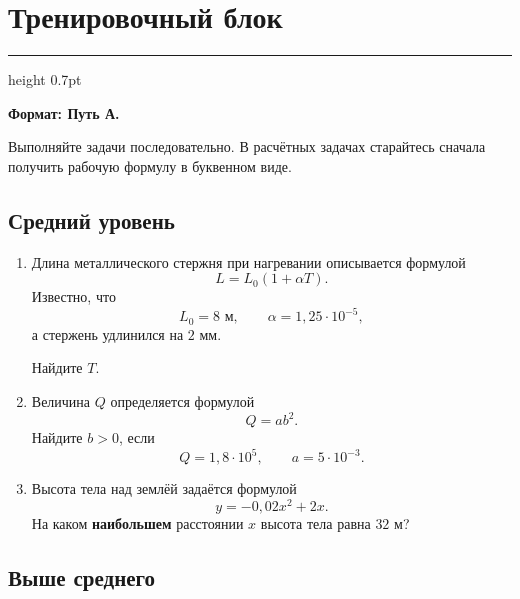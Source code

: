\documentclass[a4paper,12pt]{article}
\newcommand{\sectionline}{%
    \par\vspace{0.15em}
    {\color{lightaccent}\hrule height 0.7pt}
    \vspace{0.7em}
}
\begin{document}

\newpage
\thispagestyle{fancy}

\section*{\textcolor{darkaccent}{Тренировочный блок}}

\sectionline

\textbf{Формат: Путь А.}

Выполняйте задачи последовательно. В расчётных задачах старайтесь сначала
получить рабочую формулу в буквенном виде.

\subsection*{\textcolor{accent}{Средний уровень}}

\begin{enumerate}[label=\textbf{\arabic*.}]

\item
Длина металлического стержня при нагревании описывается формулой
\[
L=L_0(1+\alpha T).
\]
Известно, что
\[
L_0=8\text{ м},
\qquad
\alpha=1,25\cdot10^{-5},
\]
а стержень удлинился на \(2\) мм.

Найдите \(T\).

\item
Величина \(Q\) определяется формулой
\[
Q=ab^2.
\]
Найдите \(b>0\), если
\[
Q=1,8\cdot10^5,
\qquad
a=5\cdot10^{-3}.
\]

\item
Высота тела над землёй задаётся формулой
\[
y=-0,02x^2+2x.
\]
На каком \textbf{наибольшем} расстоянии \(x\) высота тела равна \(32\) м?

\end{enumerate}

\subsection*{\textcolor{accent}{Выше среднего}}
\end{document}
